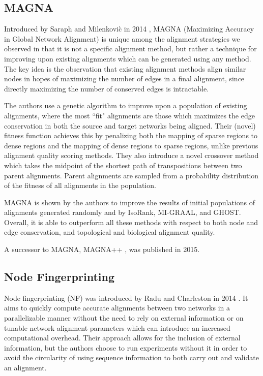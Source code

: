 \documentclass[12pt]{thesis}
\theoremstyle{plain}
\theoremstyle{definition}
\theoremstyle{remark}
\begin{document}
\subsection{MAGNA}

Introduced by Saraph and Milenkovi\`{c} in 2014 \cite{Saraph_2014}, MAGNA (Maximizing Accuracy in Global Network Alignment) is unique among the alignment strategies we observed in that it is not a specific alignment method, but rather a technique for improving upon existing alignments which can be generated using any method. The key idea is the observation that existing alignment methods align similar nodes in hopes of maximizing the number of edges in a final alignment, since directly maximizing the number of conserved edges is intractable. 

The authors use a genetic algorithm to improve upon a population of existing alignments, where the most ``fit" alignments are those which maximizes the edge conservation in both the source and target networks being aligned. Their (novel) fitness function achieves this by penalizing both the mapping of sparse regions to dense regions and the mapping of dense regions to sparse regions, unlike previous alignment quality scoring methods. They also introduce a novel crossover method which takes the midpoint of the shortest path of transpositions between two parent alignments. Parent alignments are sampled from a probability distribution of the fitness of all alignments in the population.

MAGNA is shown by the authors to improve the results of initial populations of alignments generated randomly and by IsoRank, MI-GRAAL, and GHOST. Overall, it is able to outperform all these methods with respect to both node and edge conservation, and topological and biological alignment quality.

A successor to MAGNA, MAGNA++ \cite{vijayan2015magna}, was published in 2015.

\subsection{Node Fingerprinting}

Node fingerprinting (NF) was introduced by Radu and Charleston in 2014 \cite{radu2014node}. It aims to quickly compute accurate alignments between two networks in a parallelizable manner without the need to rely on external information or on tunable network alignment parameters which can introduce an increased computational overhead. Their approach allows for the inclusion of external information, but the authors choose to run experiments without it in order to avoid the circularity of using sequence information to both carry out and validate an alignment.
\end{document}

